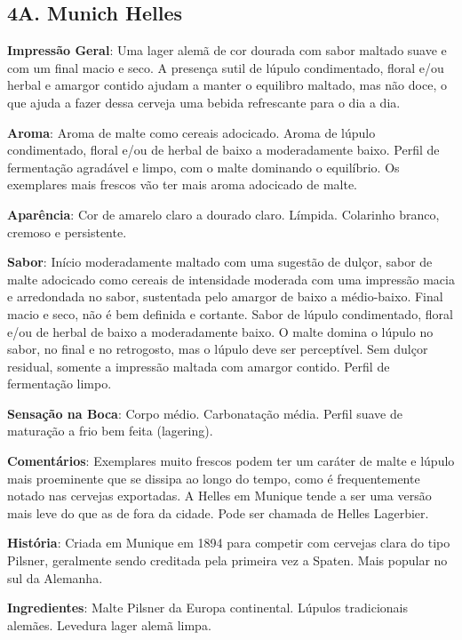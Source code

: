 \subsection*{4A. Munich Helles}

\textbf{Impressão Geral}: Uma lager alemã de cor dourada com sabor maltado suave e com um final macio e seco. A presença sutil de lúpulo condimentado, floral e/ou herbal e amargor contido ajudam a manter o equilibro maltado, mas não doce, o que ajuda a fazer dessa cerveja uma bebida refrescante para o dia a dia.

\textbf{Aroma}: Aroma de malte como cereais adocicado. Aroma de lúpulo condimentado, floral e/ou de herbal de baixo a moderadamente baixo. Perfil de fermentação agradável e limpo, com o malte dominando o equilíbrio. Os exemplares mais frescos vão ter mais aroma adocicado de malte.

\textbf{Aparência}: Cor de amarelo claro a dourado claro. Límpida. Colarinho branco, cremoso e persistente.

\textbf{Sabor}: Início moderadamente maltado com uma sugestão de dulçor, sabor de malte adocicado como cereais de intensidade moderada com uma impressão macia e arredondada no sabor, sustentada pelo amargor de baixo a médio-baixo. Final macio e seco, não é bem definida e cortante. Sabor de lúpulo condimentado, floral e/ou de herbal de baixo a moderadamente baixo. O malte domina o lúpulo no sabor, no final e no retrogosto, mas o lúpulo deve ser perceptível. Sem dulçor residual, somente a impressão maltada com amargor contido. Perfil de fermentação limpo.

\textbf{Sensação na Boca}: Corpo médio. Carbonatação média. Perfil suave de maturação a frio bem feita (lagering).

\textbf{Comentários}: Exemplares muito frescos podem ter um caráter de malte e lúpulo mais proeminente que se dissipa ao longo do tempo, como é frequentemente notado nas cervejas exportadas. A Helles em Munique tende a ser uma versão mais leve do que as de fora da cidade. Pode ser chamada de Helles Lagerbier.

\textbf{História}: Criada em Munique em 1894 para competir com cervejas clara do tipo Pilsner, geralmente sendo creditada pela primeira vez a Spaten. Mais popular no sul da Alemanha.

\textbf{Ingredientes}: Malte Pilsner da Europa continental. Lúpulos tradicionais alemães. Levedura lager alemã limpa.

